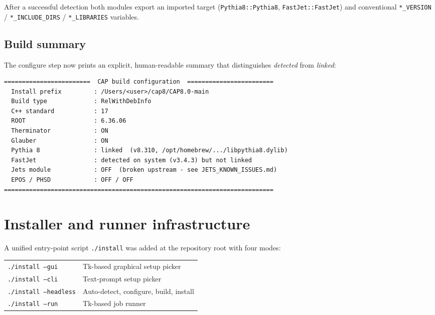 \documentclass[11pt,a4paper]{article}
\begin{document}
\noindent
After a successful detection both modules export an imported target
(\texttt{Pythia8::Pythia8}, \texttt{FastJet::FastJet}) and conventional
\texttt{*\_VERSION} / \texttt{*\_INCLUDE\_DIRS} / \texttt{*\_LIBRARIES}
variables.

\subsection{Build summary}

The configure step now prints an explicit, human-readable summary that
distinguishes \emph{detected} from \emph{linked}:

\begin{lstlisting}
========================  CAP build configuration  ========================
  Install prefix         : /Users/<user>/cap8/CAP8.0-main
  Build type             : RelWithDebInfo
  C++ standard           : 17
  ROOT                   : 6.36.06
  Therminator            : ON
  Glauber                : ON
  Pythia 8               : linked  (v8.310, /opt/homebrew/.../libpythia8.dylib)
  FastJet                : detected on system (v3.4.3) but not linked
  Jets module            : OFF  (broken upstream - see JETS_KNOWN_ISSUES.md)
  EPOS / PHSD            : OFF / OFF
===========================================================================
\end{lstlisting}

\section{Installer and runner infrastructure}

A unified entry-point script \texttt{./install} was added at the repository
root with four modes:

\begin{center}
\begin{tabular}{ll}
\toprule
\texttt{./install --gui}      & Tk-based graphical setup picker \\
\texttt{./install --cli}      & Text-prompt setup picker \\
\texttt{./install --headless} & Auto-detect, configure, build, install \\
\texttt{./install --run}      & Tk-based job runner \\
\bottomrule
\end{tabular}
\end{center}
\end{document}
